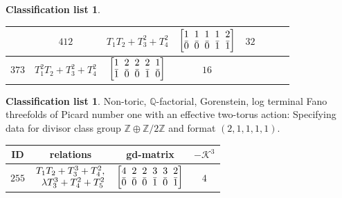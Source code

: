 \documentclass[10pt,a4paper]{amsart}
\theoremstyle{definition}
\newtheorem{class-list}[thm]{Classification list}
\def\ZZ{{\mathbb Z}}
\def\QQ{{\mathbb Q}}
\numberwithin{equation}{section}
\begin{document}
\begin{class-list}
\begin{table}[h!]
\begin{tabu}{c|c|c|c||c|c|c|c}
&${412}$&${T_{1}T_{2}+T_{3}^{2}+T_{4}^{2}}$
&$\arraycolsep=1mm\begin{bmatrix}{1} & {1} & {1} & {1} & {2} \\ {\bar{0}} & {\bar{0}} & {\bar{0}} & {\bar{1}} & {\bar{1}}\end{bmatrix}$&${32}$
\\
\hline
${373}$&${T_{1}^{2}T_{2}+T_{3}^{2}+T_{4}^{2}}$
&$\arraycolsep=1mm\begin{bmatrix}{1} & {2} & {2} & {2} & {1} \\ {\bar{1}} & {\bar{0}} & {\bar{0}} & {\bar{1}} & {\bar{0}}\end{bmatrix}$&${16}$
\\
\end{tabu}\vspace{1mm}
\end{table}
\end{class-list}

\begin{class-list}
Non-toric, $\QQ$-factorial, Gorenstein, log terminal Fano
threefolds of Picard number one with an effective two-torus action:
Specifying data for divisor class group $\ZZ\oplus \ZZ/2\ZZ$ and
format $(2,1,1,1,1)$.
\begin{table}[h!]\centering\setlength{\tabcolsep}{5.5pt}
\renewcommand{\arraystretch}{1.25}\small\tabulinesep=1mm
\begin{tabu}{c|c|c|c}
\hline
ID&relations&gd-matrix&$-\mathcal{K}^3$
\\
\hline
${255}$&$\setlength{\arraycolsep}{1pt}\begin{array}{r}{T_{1}T_{2}+T_{3}^{3}+T_{4}^{2}},\\ {\lambda T_{3}^{3}+T_{4}^{2}+T_{5}^{2}}\end{array}$
&$\arraycolsep=1mm\begin{bmatrix}{4} & {2} & {2} & {3} & {3} & {2} \\ {\bar{0}} & {\bar{0}} & {\bar{0}} & {\bar{1}} & {\bar{0}} & {\bar{1}}\end{bmatrix}$&${4}$
\\
\hline
\end{tabu}\vspace{-2mm}
\end{table}
\end{class-list}
\end{document}
